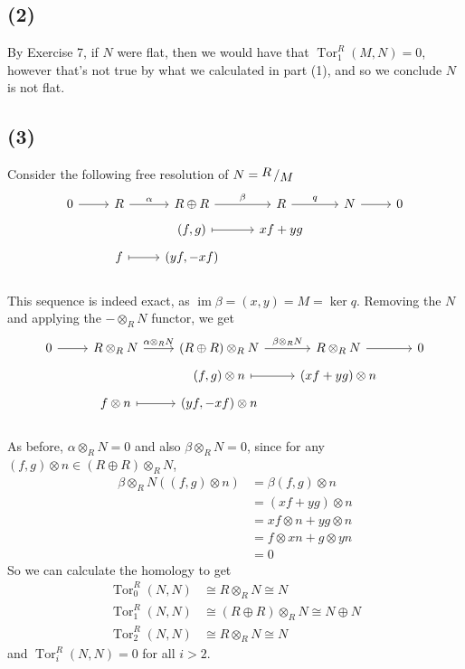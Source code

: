 \documentclass{article}
\DeclareMathOperator{\im}{im}
\DeclareMathOperator{\Tor}{Tor}
\newcommand{\tensor}{\otimes}
\newcommand{\quotient}[2]{{\raisebox{.2em}{$#1$}\left/\raisebox{-.2em}{$#2$}\right.}}
\newcommand{\isom}{\cong}
\begin{document}
\subsection*{(2)}

By Exercise 7, if $N$ were flat, then we would have that $\Tor_1^R(M, N) = 0$,
however that's not true by what we calculated in part (1), and so we conclude
$N$ is not flat.

\subsection*{(3)}

Consider the following free resolution of $N = \quotient{R}{M}$
\[
\begin{tikzcd}[row sep=tiny]
	0 & R & R\oplus R & R & N & 0\\
	&& (f, g) & xf + yg\\
	& f & (yf, -xf)\\
	\arrow[from=1-1, to=1-2]
	\arrow["\alpha", from=1-2, to=1-3]
	\arrow["\beta", from=1-3, to=1-4]
	\arrow["q", from=1-4, to=1-5]
	\arrow[from=1-5, to=1-6]
	\arrow[maps to, from=2-3, to=2-4]
	\arrow[maps to, from=3-2, to=3-3]
\end{tikzcd}
\]
This sequence is indeed exact, as $\im \beta = (x,y) = M = \ker q$.
Removing the $N$ and applying the $-\tensor_R N$ functor, we get
\[
\begin{tikzcd}[row sep=tiny]
	0 & R\tensor_R N & (R\oplus R)\tensor_R N & R\tensor_R N & 0\\
	&& (f, g)\tensor n & (xf + yg)\tensor n\\
	& f\tensor n & (yf, -xf)\tensor n\\
	\arrow[from=1-1, to=1-2]
	\arrow["\alpha\tensor_R N", from=1-2, to=1-3]
	\arrow["\beta\tensor_R N", from=1-3, to=1-4]
	\arrow[from=1-4, to=1-5]
	\arrow[maps to, from=2-3, to=2-4]
	\arrow[maps to, from=3-2, to=3-3]
\end{tikzcd}
\]
As before, $\alpha\tensor_R N = 0$ and also $\beta\tensor_R N = 0$, since for
any $(f, g)\tensor n \in (R\oplus R)\tensor_R N$,
\begin{align*}
	\beta\tensor_R N((f, g)\tensor n) &= \beta(f, g) \tensor n\\
	&= (xf + yg) \tensor n\\
	&= x f\tensor n + y g \tensor n\\
	&= f \tensor xn + g \tensor yn\\
	&= 0
\end{align*}
So we can calculate the homology to get
\begin{align*}
	\Tor_0^R(N, N) &\isom R \tensor_R N \isom N\\
	\Tor_1^R(N, N) &\isom (R \oplus R)\tensor_R N \isom N \oplus N\\
	\Tor_2^R(N, N) &\isom R \tensor_R N \isom N
\end{align*}
and $\Tor_i^R(N, N) = 0$ for all $i > 2$.
\end{document}
